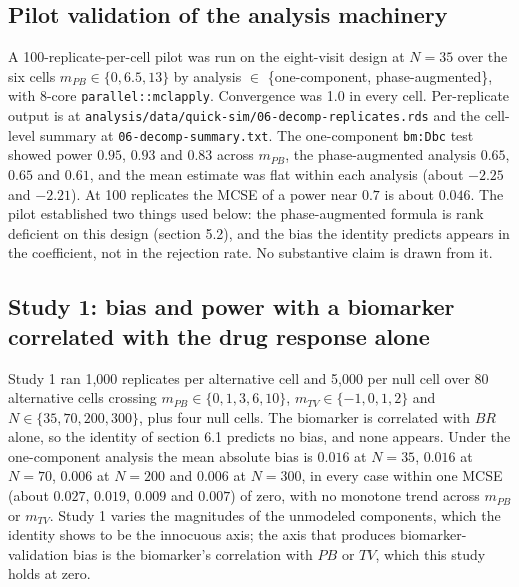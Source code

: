 \documentclass[
  11pt,
]{article}
\newcounter{none} %
\begin{document}
\subsection{Pilot validation of the analysis machinery}\label{pilot-validation-of-the-analysis-machinery}

A 100-replicate-per-cell pilot was run on the eight-visit design at
\(N = 35\) over the six cells \(m_{PB} \in \{0, 6.5, 13\}\) by analysis
\(\in\) \{one-component, phase-augmented\}, with 8-core
\texttt{parallel::mclapply}. Convergence was 1.0 in every cell.
Per-replicate output is at \texttt{analysis/data/quick-sim/06-decomp-replicates.rds}
and the cell-level summary at \texttt{06-decomp-summary.txt}. The
one-component \texttt{bm:Dbc} test showed power \(0.95\), \(0.93\) and \(0.83\)
across \(m_{PB}\), the phase-augmented analysis \(0.65\), \(0.65\) and \(0.61\),
and the mean estimate was flat within each analysis (about \(-2.25\) and
\(-2.21\)). At 100 replicates the MCSE of a power near \(0.7\) is about
\(0.046\). The pilot established two things used below: the phase-augmented
formula is rank deficient on this design (section 5.2), and the bias the
identity predicts appears in the coefficient, not in the rejection rate.
No substantive claim is drawn from it.

\subsection{Study 1: bias and power with a biomarker correlated with the drug response alone}\label{study-1-bias-and-power-with-a-biomarker-correlated-with-the-drug-response-alone}

Study 1 ran 1,000 replicates per alternative cell and 5,000 per null cell
over 80 alternative cells crossing \(m_{PB} \in \{0,1,3,6,10\}\),
\(m_{TV} \in \{-1,0,1,2\}\) and \(N \in \{35,70,200,300\}\), plus four null
cells. The biomarker is correlated with \(BR\) alone, so the identity of
section 6.1 predicts no bias, and none appears. Under the one-component
analysis the mean absolute bias is \(0.016\) at \(N = 35\), \(0.016\) at
\(N = 70\), \(0.006\) at \(N = 200\) and \(0.006\) at \(N = 300\), in every case
within one MCSE (about \(0.027\), \(0.019\), \(0.009\) and \(0.007\)) of zero,
with no monotone trend across \(m_{PB}\) or \(m_{TV}\). Study 1 varies the
magnitudes of the unmodeled components, which the identity shows to be
the innocuous axis; the axis that produces biomarker-validation bias is
the biomarker's correlation with \(PB\) or \(TV\), which this study holds at
zero.
\end{document}
